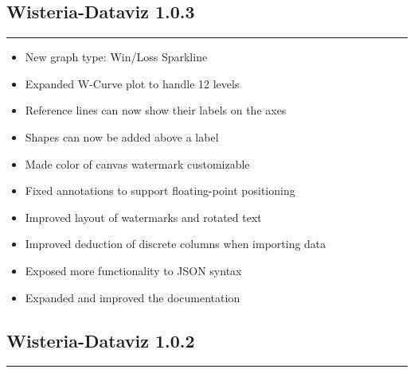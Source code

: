 \documentclass[
]{scrartcl}
\providecommand{\tightlist}{%
  \setlength{\itemsep}{0pt}\setlength{\parskip}{0pt}}
\begin{document}
\subsection*{Wisteria-Dataviz 1.0.3}\label{section-9}

\begin{center}\rule{0.5\linewidth}{0.5pt}\end{center}

\begin{itemize}
\tightlist
\item
  New graph type: Win/Loss Sparkline
\item
  Expanded W-Curve plot to handle 12 levels
\item
  Reference lines can now show their labels on the axes
\item
  Shapes can now be added above a label
\item
  Made color of canvas watermark customizable
\item
  Fixed annotations to support floating-point positioning
\item
  Improved layout of watermarks and rotated text
\item
  Improved deduction of discrete columns when importing data
\item
  Exposed more functionality to JSON syntax
\item
  Expanded and improved the documentation
\end{itemize}

\subsection*{Wisteria-Dataviz 1.0.2}\label{section-10}

\begin{center}\rule{0.5\linewidth}{0.5pt}\end{center}
\end{document}
